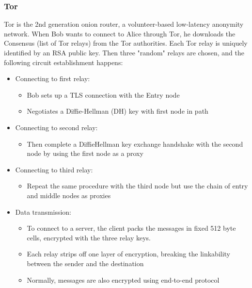 \documentclass[10pt,a4paper]{report}
\begin{document}
\subsubsection{Tor}
Tor is the 2nd generation onion router, a volunteer-based low-latency anonymity network. When Bob wants to connect to Alice through Tor, he downloads the Consensus (list of Tor relays) from the Tor authorities. Each Tor relay is uniquely identified by an RSA public key. Then three "random" relays are chosen, and the following circuit establishment happens:
\begin{itemize}
\item Connecting to first relay:
\begin{itemize}
\item Bob sets up a TLS connection with the Entry node
\item Negotiates a Diffie-Hellman (DH) key with first node in path
\end{itemize}
\item Connecting to second relay:
\begin{itemize}
\item Then complete a DiffieHellman key exchange handshake with the second node by using the first node as a proxy
\end{itemize}
\item Connecting to third relay:
\begin{itemize}
\item Repeat the same procedure with the third node but use the chain of entry and middle nodes as proxies
\end{itemize}
\item Data transmission:
\begin{itemize}
\item To connect to a server, the client packs the messages in fixed 512 byte cells, encrypted with the three relay keys.
\item Each relay strips off one layer of encryption, breaking the linkability between the sender and the destination
\item Normally, messages are also encrypted using end-to-end protocol
\end{itemize}
\end{itemize}
\end{document}
